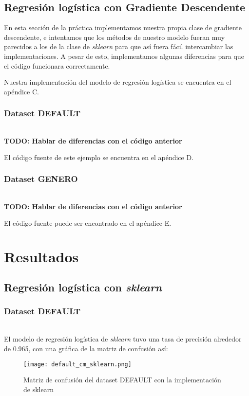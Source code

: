 \documentclass[sigconf,authorversion,nonacm]{acmart}
\begin{document}
\subsection{Regresión logística con Gradiente Descendente}
En esta sección de la práctica implementamos nuestra propia clase de gradiente descendente, e intentamos que los métodos de nuestro modelo fueran muy parecidos a los de la clase de \textit{sklearn} para que así fuera fácil intercambiar las implementaciones. A pesar de esto, implementamos algunas diferencias para que el código funcionara correctamente.

Nuestra implementación del modelo de regresión logística se encuentra en el apéndice C.

\subsubsection{Dataset DEFAULT}\hfill\\
\textbf{TODO: Hablar de diferencias con el código anterior}

El código fuente de este ejemplo se encuentra en el apéndice D.

\subsubsection{Dataset GENERO}\hfill\\
\textbf{TODO: Hablar de diferencias con el código anterior}

El código fuente puede ser encontrado en el apéndice E.


\section{Resultados}

\subsection{Regresión logística con \textit{sklearn}}

\subsubsection{Dataset DEFAULT}\hfill\\
El modelo de regresión logística de \textit{sklearn} tuvo una tasa de precisión alrededor de 0.965, con una gráfica de la matriz de confusión así:

\begin{figure}[H]
  \centering
  \texttt{[image: default\_cm\_sklearn.png]}
  \caption{Matriz de confusión del dataset DEFAULT con la implementación de sklearn}
\end{figure}
\end{document}
